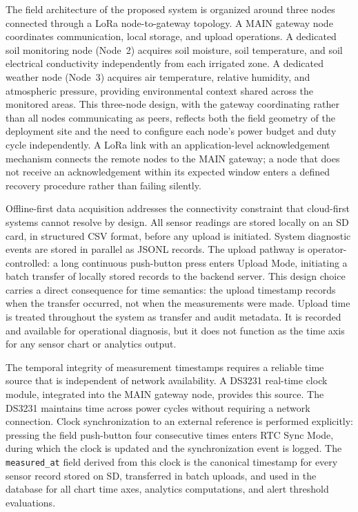 The field architecture of the proposed system is organized around three nodes
connected through a LoRa node-to-gateway topology. A MAIN gateway node
coordinates communication, local storage, and upload operations. A dedicated
soil monitoring node (Node~2) acquires soil moisture, soil temperature, and
soil electrical conductivity independently from each irrigated zone. A
dedicated weather node (Node~3) acquires air temperature, relative humidity,
and atmospheric pressure, providing environmental context shared across the
monitored areas. This three-node design, with the gateway coordinating rather
than all nodes communicating as peers, reflects both the field geometry of the
deployment site and the need to configure each node's power budget and duty
cycle independently. A LoRa link with an application-level acknowledgement
mechanism connects the remote nodes to the MAIN gateway; a node that does not
receive an acknowledgement within its expected window enters a defined recovery
procedure rather than failing silently.

Offline-first data acquisition addresses the connectivity constraint that
cloud-first systems cannot resolve by design. All sensor readings are stored
locally on an SD card, in structured CSV format, before any upload is
initiated. System diagnostic events are stored in parallel as JSONL records.
The upload pathway is operator-controlled: a long continuous push-button press
enters Upload Mode, initiating a batch transfer of locally stored records to
the backend server. This design choice carries a direct consequence for time
semantics: the upload timestamp records when the transfer occurred, not when
the measurements were made. Upload time is treated throughout the system as
transfer and audit metadata. It is recorded and available for operational
diagnosis, but it does not function as the time axis for any sensor chart or
analytics output.

The temporal integrity of measurement timestamps requires a reliable time
source that is independent of network availability. A DS3231 real-time clock
module, integrated into the MAIN gateway node, provides this source. The
DS3231 maintains time across power cycles without requiring a network
connection. Clock synchronization to an external reference is performed
explicitly: pressing the field push-button four consecutive times enters RTC
Sync Mode, during which the clock is updated and the synchronization event is
logged. The \texttt{measured\_at} field derived from this clock is the
canonical timestamp for every sensor record stored on SD, transferred in batch
uploads, and used in the database for all chart time axes, analytics
computations, and alert threshold evaluations.

